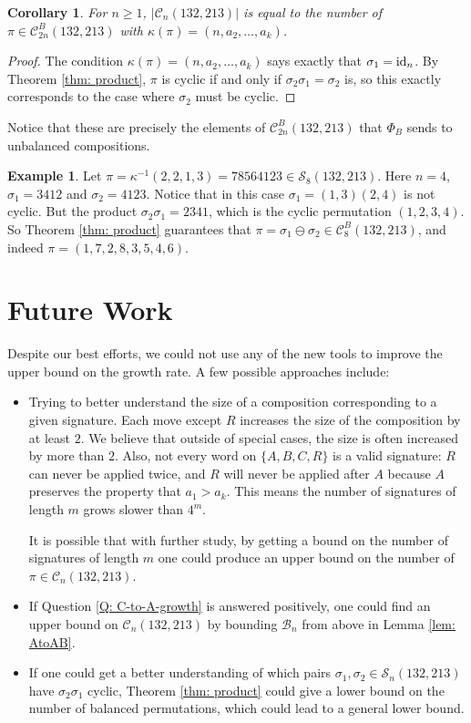 \documentclass[11pt]{article}
\renewcommand\S{\mathcal S}
\newcommand\cB{\mathcal B}
\newcommand\C{\mathcal C}
\newtheorem{corollary}[theorem]{Corollary}
\theoremstyle{definition}
\newtheorem{example}[theorem]{Example}
\begin{document}
\begin{corollary}
    For $n \geq 1$, $|\C_n(132,213)|$ is equal to the number of $\pi \in \C_{2n}^B(132,213)$ with $\kappa(\pi) = (n,a_2,\dots,a_k)$.
\end{corollary}

\begin{proof}
    The condition $\kappa(\pi) = (n,a_2,\dots,a_k)$ says exactly that $\sigma_1 = {\rm id}_n$. By Theorem \ref{thm: product}, $\pi$ is cyclic if and only if $\sigma_2\sigma_1 = \sigma_2$ is, so this exactly corresponds to the case where $\sigma_2$ must be cyclic.
\end{proof}

Notice that these are precisely the elements of $\C_{2n}^B(132,213)$ that $\Phi_B$ sends to unbalanced compositions. 

\begin{example}
    Let $\pi = \kappa^{-1}(2,2,1,3) = 78564123 \in \S_8(132,213)$. Here $n = 4$, $\sigma_1 = 3412$ and $\sigma_2 = 4123$. Notice that in this case $\sigma_1 = (1,3)(2,4)$ is not cyclic. But the product $\sigma_2\sigma_1 = 2341$, which is the cyclic permutation $(1,2,3,4)$. So Theorem \ref{thm: product} guarantees that $\pi = \sigma_1 \ominus \sigma_2 \in \C_8^B(132,213)$, and indeed $\pi = (1,7,2,8,3,5,4,6)$.
\end{example}

\section{Future Work} \label{sec: future-work}

Despite our best efforts, we could not use any of the new tools to improve the upper bound on the growth rate. A few possible approaches include:
\begin{itemize}
    \item Trying to better understand the size of a composition corresponding to a given signature. Each move except $R$ increases the size of the composition by at least $2$. We believe that outside of special cases, the size is often increased by more than $2$. Also, not every word on $\{A,B,C,R\}$ is a valid signature: $R$ can never be applied twice, and $R$ will never be applied after $A$ because $A$ preserves the property that $a_1 > a_k$. This means the number of signatures of length $m$ grows slower than $4^m$.

    It is possible that with further study, by getting a bound on the number of signatures of length $m$ one could produce an upper bound on the number of $\pi \in \C_n(132,213)$.

    \item If Question \ref{Q: C-to-A-growth} is answered positively, one could find an upper bound on $\C_n(132,213)$ by bounding $\cB_n$ from above in Lemma \ref{lem: AtoAB}.

    \item If one could get a better understanding of which pairs $\sigma_1,\sigma_2 \in \S_n(132,213)$ have $\sigma_2\sigma_1$ cyclic, Theorem \ref{thm: product} could give a lower bound on the number of balanced permutations, which could lead to a general lower bound.
\end{itemize}
\end{document}
